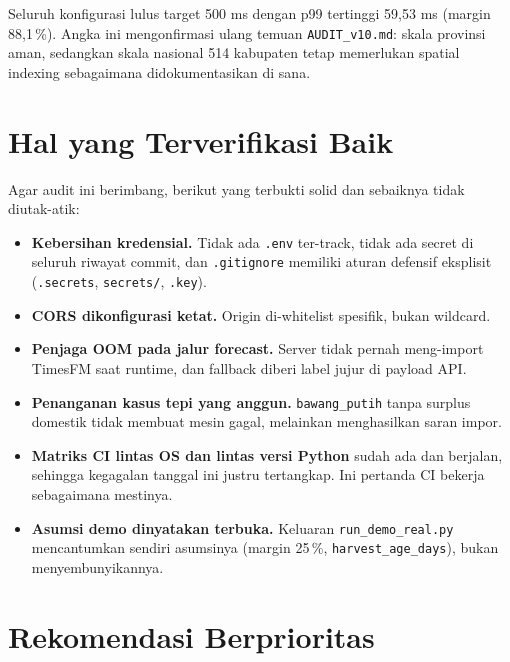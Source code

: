 \documentclass[11pt,a4paper]{article}
\newcommand{\code}[1]{\texttt{\small #1}}
\begin{document}
\noindent
Seluruh konfigurasi lulus target 500 ms dengan p99 tertinggi 59,53 ms (margin 88,1\,\%). Angka ini
mengonfirmasi ulang temuan \code{AUDIT\_v10.md}: skala provinsi aman, sedangkan skala nasional 514
kabupaten tetap memerlukan spatial indexing sebagaimana didokumentasikan di sana.

\section{Hal yang Terverifikasi Baik}

Agar audit ini berimbang, berikut yang terbukti solid dan sebaiknya tidak diutak-atik:

\begin{itemize}
  \item \textbf{Kebersihan kredensial.} Tidak ada \code{.env} ter-track, tidak ada secret di
        seluruh riwayat commit, dan \code{.gitignore} memiliki aturan defensif eksplisit
        (\code{.secrets}, \code{secrets/}, \code{*.key}).
  \item \textbf{CORS dikonfigurasi ketat.} Origin di-whitelist spesifik, bukan wildcard.
  \item \textbf{Penjaga OOM pada jalur forecast.} Server tidak pernah meng-import TimesFM saat
        runtime, dan fallback diberi label jujur di payload API.
  \item \textbf{Penanganan kasus tepi yang anggun.} \code{bawang\_putih} tanpa surplus domestik
        tidak membuat mesin gagal, melainkan menghasilkan saran impor.
  \item \textbf{Matriks CI lintas OS dan lintas versi Python} sudah ada dan berjalan, sehingga
        kegagalan tanggal ini justru tertangkap. Ini pertanda CI bekerja sebagaimana mestinya.
  \item \textbf{Asumsi demo dinyatakan terbuka.} Keluaran \code{run\_demo\_real.py} mencantumkan
        sendiri asumsinya (margin 25\,\%, \code{harvest\_age\_days}), bukan menyembunyikannya.
\end{itemize}

\section{Rekomendasi Berprioritas}
\end{document}
